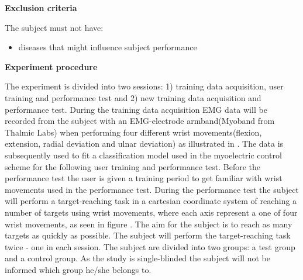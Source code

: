 \textbf{Exclusion criteria}

The subject must not have:
\begin{itemize}
	\item diseases that might influence subject performance   
\end{itemize}


\textbf{Experiment procedure}

The experiment is divided into two sessions: 1) training data acquisition, user training and performance test and 2) new training data acquisition and performance test. During the training data acquisition EMG data will be recorded from the subject with an EMG-electrode armband(Myoband from Thalmic Labs) when performing four different wrist movements(flexion, extension, radial deviation and ulnar deviation) as illustrated in . The data is subsequently used to fit a classification model used in the myoelectric control scheme for the following user training and performance test. Before the performance test the user is given a training period to get familiar with wrist movements used in the performance test. During the performance test the subject will perform a target-reaching task in a cartesian coordinate system of reaching a number of targets using wrist movements, where each axis represent a one of four wrist movements, as seen in figure . The aim for the subject is to reach as many targets as quickly as possible. The subject will perform the target-reaching task twice - one in each session. The subject are divided into two groups: a test group and a control group. As the study is single-blinded the subject will not be informed which group he/she belongs to.

